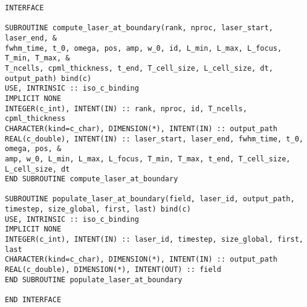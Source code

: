 \begin{lstlisting}[style=FORTRAN, caption=Fortran interfaces for C++ library functions]
INTERFACE

SUBROUTINE compute_laser_at_boundary(rank, nproc, laser_start, laser_end, &
fwhm_time, t_0, omega, pos, amp, w_0, id, L_min, L_max, L_focus, T_min, T_max, &
T_ncells, cpml_thickness, t_end, T_cell_size, L_cell_size, dt, output_path) bind(c)
USE, INTRINSIC :: iso_c_binding
IMPLICIT NONE
INTEGER(c_int), INTENT(IN) :: rank, nproc, id, T_ncells, cpml_thickness
CHARACTER(kind=c_char), DIMENSION(*), INTENT(IN) :: output_path
REAL(c_double), INTENT(IN) :: laser_start, laser_end, fwhm_time, t_0, omega, pos, &
amp, w_0, L_min, L_max, L_focus, T_min, T_max, t_end, T_cell_size, L_cell_size, dt
END SUBROUTINE compute_laser_at_boundary

SUBROUTINE populate_laser_at_boundary(field, laser_id, output_path, timestep, size_global, first, last) bind(c)
USE, INTRINSIC :: iso_c_binding
IMPLICIT NONE
INTEGER(c_int), INTENT(IN) :: laser_id, timestep, size_global, first, last
CHARACTER(kind=c_char), DIMENSION(*), INTENT(IN) :: output_path
REAL(c_double), DIMENSION(*), INTENT(OUT) :: field
END SUBROUTINE populate_laser_at_boundary

END INTERFACE
\end{lstlisting}

